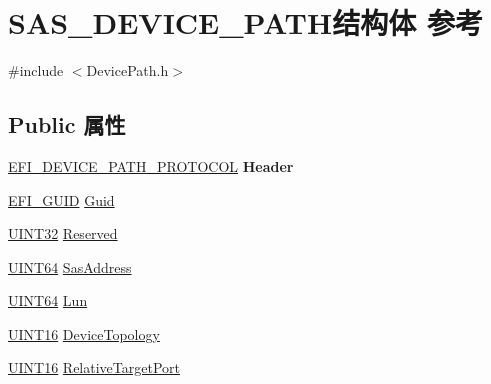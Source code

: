 \hypertarget{struct_s_a_s___d_e_v_i_c_e___p_a_t_h}{}\section{S\+A\+S\+\_\+\+D\+E\+V\+I\+C\+E\+\_\+\+P\+A\+T\+H结构体 参考}
\label{struct_s_a_s___d_e_v_i_c_e___p_a_t_h}


{\ttfamily \#include $<$Device\+Path.\+h$>$}

\subsection*{Public 属性}
\begin{DoxyCompactItemize}
\item 
\mbox{\label{struct_s_a_s___d_e_v_i_c_e___p_a_t_h_a7d99a47278edf9659676af4262e2d3e3}} 
\hyperlink{struct_e_f_i___d_e_v_i_c_e___p_a_t_h___p_r_o_t_o_c_o_l}{E\+F\+I\+\_\+\+D\+E\+V\+I\+C\+E\+\_\+\+P\+A\+T\+H\+\_\+\+P\+R\+O\+T\+O\+C\+OL} {\bfseries Header}
\item 
\hyperlink{_uefi_base_type_8h_ad87614428813f71edb2c2d802e9ce2af}{E\+F\+I\+\_\+\+G\+U\+ID} \hyperlink{struct_s_a_s___d_e_v_i_c_e___p_a_t_h_a396cb7afc729fa9d73f305875f48f424}{Guid}
\item 
\hyperlink{_processor_bind_8h_ae1e6edbbc26d6fbc71a90190d0266018}{U\+I\+N\+T32} \hyperlink{struct_s_a_s___d_e_v_i_c_e___p_a_t_h_a9c645def904d081a4ac2c1b46738a80e}{Reserved}
\item 
\hyperlink{_processor_bind_8h_a57be03562867144161c1bfee95ca8f7c}{U\+I\+N\+T64} \hyperlink{struct_s_a_s___d_e_v_i_c_e___p_a_t_h_a661df97ceeed021cc35e546709ca07af}{Sas\+Address}
\item 
\hyperlink{_processor_bind_8h_a57be03562867144161c1bfee95ca8f7c}{U\+I\+N\+T64} \hyperlink{struct_s_a_s___d_e_v_i_c_e___p_a_t_h_a10c0671d4fb48c98c2257a73f5060462}{Lun}
\item 
\hyperlink{_processor_bind_8h_a09f1a1fb2293e33483cc8d44aefb1eb1}{U\+I\+N\+T16} \hyperlink{struct_s_a_s___d_e_v_i_c_e___p_a_t_h_ab4d2a222318daba6c640504782760302}{Device\+Topology}
\item 
\hyperlink{_processor_bind_8h_a09f1a1fb2293e33483cc8d44aefb1eb1}{U\+I\+N\+T16} \hyperlink{struct_s_a_s___d_e_v_i_c_e___p_a_t_h_a22052a70c445310a8d2418c8362876b0}{Relative\+Target\+Port}
\end{DoxyCompactItemize}


